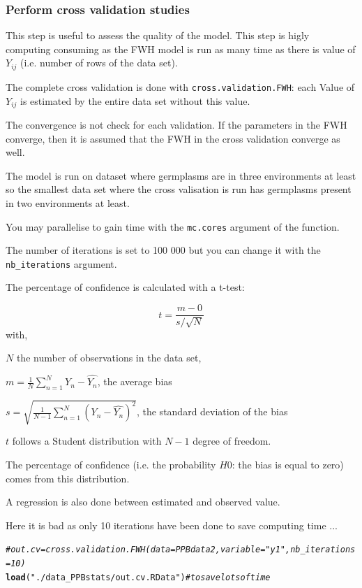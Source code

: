\documentclass{article}\usepackage[]{graphicx}\usepackage[]{color}
\makeatletter
\newcommand{\hlstr}[1]{\textcolor[rgb]{0.192,0.494,0.8}{#1}}%
\newcommand{\hlcom}[1]{\textcolor[rgb]{0.678,0.584,0.686}{\textit{#1}}}%
\newcommand{\hlstd}[1]{\textcolor[rgb]{0.345,0.345,0.345}{#1}}%
\newcommand{\hlkwd}[1]{\textcolor[rgb]{0.737,0.353,0.396}{\textbf{#1}}}%
\newenvironment{kframe}{%
 \def\at@end@of@kframe{}%
 \ifinner\ifhmode%
  \def\at@end@of@kframe{\end{minipage}}%
  \begin{minipage}{\columnwidth}%
 \fi\fi%
 \def\FrameCommand##1{\hskip\@totalleftmargin \hskip-\fboxsep
 \colorbox{shadecolor}{##1}\hskip-\fboxsep
     \hskip-\linewidth \hskip-\@totalleftmargin \hskip\columnwidth}%
 \MakeFramed {\advance\hsize-\width
   \@totalleftmargin\z@ \linewidth\hsize
   \@setminipage}}%
 {\par\unskip\endMakeFramed%
 \at@end@of@kframe}
\newenvironment{knitrout}{}{} %
\makeatother
\begin{document}
\subsubsection{Perform cross validation studies}

This step is useful to assess the quality of the model.
This step is higly computing consuming as the FWH model is run as many time as there is value of $Y_{ij}$ (i.e. number of rows of the data set).

The complete cross validation is done with \texttt{cross.validation.FWH}: 
each Value of $Y_{ij}$ is estimated by the entire data set without this value.

The convergence is not check for each validation. 
If the parameters in the FWH converge, then it is assumed that the FWH in the cross validation converge as well.

The model is run on dataset where germplasms are in three environments at least so the smallest data set where the cross valisation is run has germplasms present in two environments at least. 

You may parallelise to gain time with the \texttt{mc.cores} argument of the function.

The number of iterations is set to 100 000 but you can change it with the \texttt{nb\_iterations} argument.

The percentage of confidence is calculated with a t-test:

\begin{displaymath}
t = \frac{m - 0}{s/\sqrt{N}}
\end{displaymath}
with,

$N$ the number of observations in the data set,

$m = \frac{1}{N} \sum\limits_{n=1}^N Y_{n} - \hat{Y_{n}}$, the average bias

$s = \sqrt{\frac{1}{N-1} \sum\limits_{n=1}^N (Y_{n} - \hat{Y_{n}})^2}$, the standard deviation of the bias

$t$ follows a Student distribution with $N-1$ degree of freedom.

The percentage of confidence (i.e. the probability $H0$: the bias is equal to zero) comes from this distribution.

A regression is also done between estimated and observed value.

Here it is bad as only 10 iterations have been done to save computing time ...

\begin{knitrout}
\color{fgcolor}\begin{kframe}
\begin{alltt}
\hlcom{# out.cv = cross.validation.FWH(data = PPBdata2, variable = "y1", nb_iterations = 10)}
\hlkwd{load}\hlstd{(}\hlstr{"./data_PPBstats/out.cv.RData"}\hlstd{)} \hlcom{# to save lots of time}
\end{alltt}
\end{kframe}
\end{knitrout}
\end{document}
